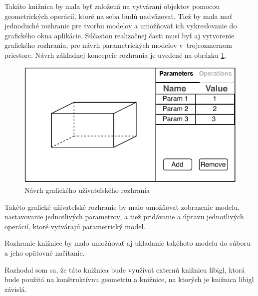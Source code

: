  Takáto knižnica by mala byť založená na vytváraní objektov pomocou geometrických operácií, ktoré na seba budú nadväzovať.
Tiež by mala mať jednoduché rozhranie pre tvorbu modelov a umožňovať ich vykresľovanie do grafického okna aplikácie. 
Súčasťou realizačnej časti musí byť aj vytvorenie grafického rozhrania, pre návrh parametrických modelov v~trojrozmernom priestore. Návrh základnej koncepcie rozhrania je uvedené na obrázku \ref{fig:GUI_draft}.
\begin{figure}[H]
	\centering
	\includegraphics[height=0.5\textwidth]{obrazky-figures/Examples/mockup.pdf}
	\caption{Návrh grafického užívateľského rozhrania}
	\label{fig:GUI_draft}
\end{figure}

Takéto grafické užívateľské rozhranie by malo umožňovať zobrazenie modelu, nastavovanie jednotlivých parametrov, a tiež pridávanie a úpravu jednotlivých operácií, ktoré vytvárajú parametrický model.

Rozhranie knižnice by malo umožňovať aj ukladanie takéhoto modelu do súboru a jeho opätovné načítanie. 


Rozhodol som sa, že táto knižnica bude využívať externú knižnicu libigl, ktorá bude použitá na konštruktívnu geometriu a knižnice, na ktorých je knižnica libigl závislá.

